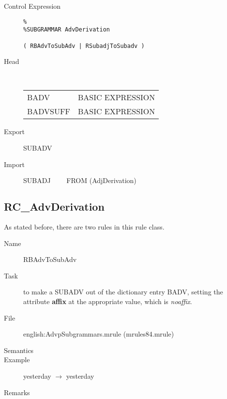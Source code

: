 \begin{description}
\item[Control Expression] \mbox{}
   \begin{verbatim}
%
%SUBGRAMMAR AdvDerivation

( RBAdvToSubAdv | RSubadjToSubadv )
   \end{verbatim}
\item[Head]    \mbox{}\\
  \begin{tabular}{ll}
  BADV    & BASIC EXPRESSION \\
  BADVSUFF & BASIC EXPRESSION
  \end{tabular}
\item[Export]  SUBADV
\item[Import] SUBADJ \ \ \ \ FROM (AdjDerivation)
\end{description}


\subsection{RC\_AdvDerivation}
As stated before, there are two rules in this rule class.

\begin{description}
\item[Name] RBAdvToSubAdv
\item[Task] to make a SUBADV out of the dictionary entry BADV, setting the 
attribute {\bf affix} at the appropriate value, which is {\em noaffix\/}.
\item[File] english:AdvpSubgrammars.mrule (mrules84.mrule)
\item[Semantics]
\item[Example] yesterday $\rightarrow$ yesterday
\item[Remarks]
\end{description}

